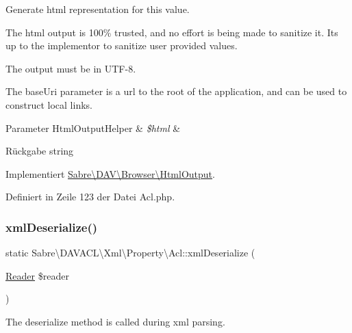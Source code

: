 Generate html representation for this value.

The html output is 100\% trusted, and no effort is being made to sanitize it. It\textquotesingle{}s up to the implementor to sanitize user provided values.

The output must be in U\+T\+F-\/8.

The base\+Uri parameter is a url to the root of the application, and can be used to construct local links.


\begin{DoxyParams}[1]{Parameter}
Html\+Output\+Helper & {\em \$html} & \\
\hline
\end{DoxyParams}
\begin{DoxyReturn}{Rückgabe}
string 
\end{DoxyReturn}


Implementiert \mbox{\hyperlink{interface_sabre_1_1_d_a_v_1_1_browser_1_1_html_output_a53a24f82474cef8c1fcf00e87de3bf7c}{Sabre\textbackslash{}\+D\+A\+V\textbackslash{}\+Browser\textbackslash{}\+Html\+Output}}.



Definiert in Zeile 123 der Datei Acl.\+php.

\mbox{\label{class_sabre_1_1_d_a_v_a_c_l_1_1_xml_1_1_property_1_1_acl_a0a763ca7c797f28c0e5642bd8fa942a4}} 
\subsubsection{\texorpdfstring{xml\+Deserialize()}{xmlDeserialize()}}
{\footnotesize\ttfamily static Sabre\textbackslash{}\+D\+A\+V\+A\+C\+L\textbackslash{}\+Xml\textbackslash{}\+Property\textbackslash{}\+Acl\+::xml\+Deserialize (\begin{DoxyParamCaption}\item[{\mbox{\hyperlink{class_sabre_1_1_xml_1_1_reader}{Reader}}}]{\$reader }\end{DoxyParamCaption})\hspace{0.3cm}{\ttfamily [static]}}

The deserialize method is called during xml parsing.

